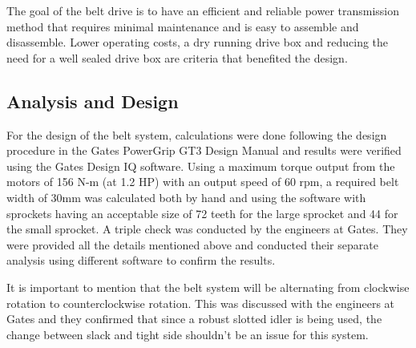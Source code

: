 The goal of the belt drive is to have an efficient and reliable power transmission method that requires minimal maintenance and is easy to assemble and disassemble. Lower operating costs, a dry running drive box and reducing the need for a well sealed drive box are criteria that benefited the design.

\subsection{Analysis and Design}
For the design of the belt system, calculations were done following the design procedure in the Gates PowerGrip GT3 Design Manual and results were verified using the Gates Design IQ software. Using a maximum torque output from the motors of 156 N-m (at 1.2 HP) with an output speed of 60 rpm, a required belt width of 30mm was calculated both by hand and using the software with sprockets having an acceptable size of 72 teeth for the large sprocket and 44 for the small sprocket. A triple check was conducted by the engineers at Gates. They were provided all the details mentioned above and conducted their separate analysis using different software to confirm the results. 

It is important to mention that the belt system will be alternating from clockwise rotation to counterclockwise rotation. This was discussed with the engineers at Gates and they confirmed that since a robust slotted idler is being used, the change between slack and tight side shouldn’t be an issue for this system.